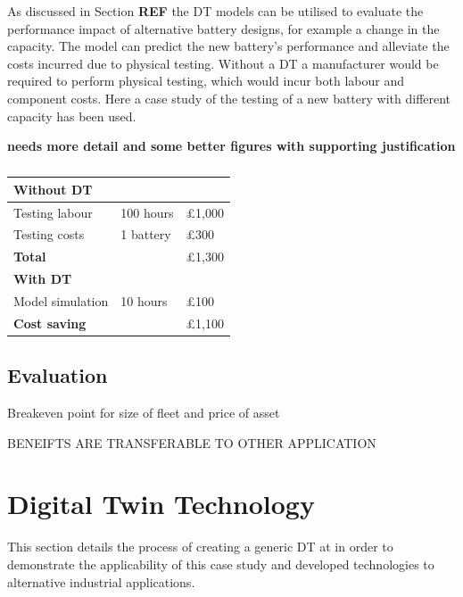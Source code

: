 \documentclass[a4paper, 10pt]{article}
\numberwithin{equation}{section}
\begin{document}
As discussed in Section \textbf{REF} the DT models can be utilised to evaluate the performance impact of alternative battery designs, for example a change in the capacity. The model can predict the new battery's performance and alleviate the costs incurred due to physical testing. Without a DT a manufacturer would be required to perform physical testing, which would incur both labour and component costs. Here a case study of the testing of a new battery with different capacity has been used. 

\textbf{needs more detail and some better figures with supporting justification}

\begin{table}[H]
\centering
\caption{}
\label{}
\begin{tabular}{|l|l|l|}
\hline
\multicolumn{3}{|l|}{\textbf{Without DT}}              \\ \hline
Testing labour           & 100 hours       & £1,000    \\ \hline
Testing costs            &   1 battery              &   £300        \\ \hline
\multicolumn{2}{|l|}{\textbf{Total}} &     £1,300      \\ \hline
\multicolumn{3}{|l|}{\textbf{With DT}}                 \\ \hline
Model simulation         & 10 hours        & £100      \\ \hline
\multicolumn{2}{|l|}{\textbf{Cost saving}} & £1,100 \textbf{} \\ \hline
\end{tabular}
\end{table}

\subsection{Evaluation}

Breakeven point for size of fleet and price of asset


BENEIFTS ARE TRANSFERABLE TO OTHER APPLICATION


\newpage
\section{Digital Twin Technology}
\label{sec:DT_technology}

This section details the process of creating a generic DT at in order to demonstrate the applicability of this case study and developed technologies to alternative industrial applications.
\end{document}
